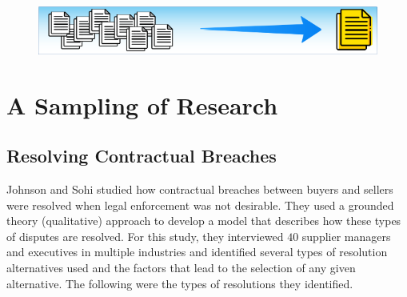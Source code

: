 \noindent\begin{minipage}{\textwidth}
	\begin{figure}[H]
		\centering
		\includegraphics[width=.85\linewidth]{gfx/Sampling_Of_Research}
		\caption*{}
		\label{01:sampling_of_research}
	\end{figure}
	\vspace{-10.0ex} %
	\section{A Sampling of Research}
\end{minipage}
\subsection{Resolving Contractual Breaches}

Johnson and Sohi\cite{johnson2016understanding} studied how contractual breaches between buyers and sellers were resolved when legal enforcement was not desirable. They used a grounded theory (qualitative) approach to develop a model that describes how these types of disputes are resolved. For this study, they interviewed $ 40 $ supplier managers and executives in multiple industries and identified several types of resolution alternatives used and the factors that lead to the selection of any given alternative. The following were the types of resolutions they identified.

